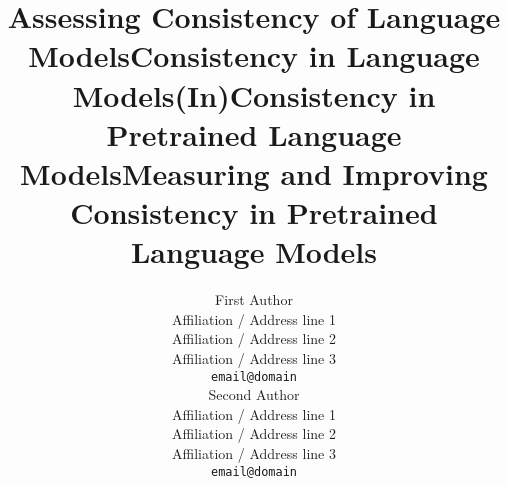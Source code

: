 \documentclass[11pt]{article}
\title{Assessing Consistency of Language Models}
\title{Consistency in Language Models}
\title{(In)Consistency in Pretrained Language Models}
\title{Measuring and Improving Consistency in Pretrained Language Models}
\author{First Author \\
  Affiliation / Address line 1 \\
  Affiliation / Address line 2 \\
  Affiliation / Address line 3 \\
  \texttt{email@domain} \\\And
  Second Author \\
  Affiliation / Address line 1 \\
  Affiliation / Address line 2 \\
  Affiliation / Address line 3 \\
  \texttt{email@domain} \\}
\begin{document}
\maketitle
\begin{abstract}

\end{abstract}


% 












% 









% 

% 










\end{document}
